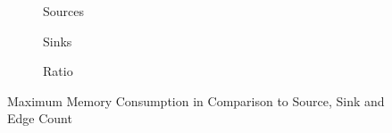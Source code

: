 \documentclass[../draft.tex]{subfiles}
\begin{document}
    \begin{figure}
        \centering
        \begin{subfigure}[b]{\textwidth}
            \centering
            \begin{subfigure}[]{0.45\textwidth}
                \centering
                \resizebox{\columnwidth}{!}{
                    
                }
            \end{subfigure}
            \qquad
            \begin{subfigure}[]{0.45\textwidth}
                \centering
                \resizebox{\columnwidth}{!}{
                    
                }
            \end{subfigure}
            \caption{Sources}
        \end{subfigure}
        \bigbreak
        \begin{subfigure}[b]{\textwidth}
            \centering
            \begin{subfigure}[]{0.45\textwidth}
                \centering
                \resizebox{\columnwidth}{!}{
                    
                }
            \end{subfigure}
            \qquad
            \begin{subfigure}[]{0.45\textwidth}
                \centering
                \resizebox{\columnwidth}{!}{
                    
                }
            \end{subfigure}
            \caption{Sinks}
        \end{subfigure}
        \bigbreak
        \begin{subfigure}[b]{\textwidth}
            \centering
            \begin{subfigure}[]{0.45\textwidth}
                \centering
                \resizebox{\columnwidth}{!}{
                    
                }
            \end{subfigure}
            \qquad
            \begin{subfigure}[]{0.45\textwidth}
                \centering
                \resizebox{\columnwidth}{!}{
                    
                }
            \end{subfigure}
            \caption{Ratio}
        \end{subfigure}
        \caption{Maximum Memory Consumption in Comparison to Source, Sink and Edge Count}
        \label{f:maxmemtoss}
    \end{figure}
\end{document}
